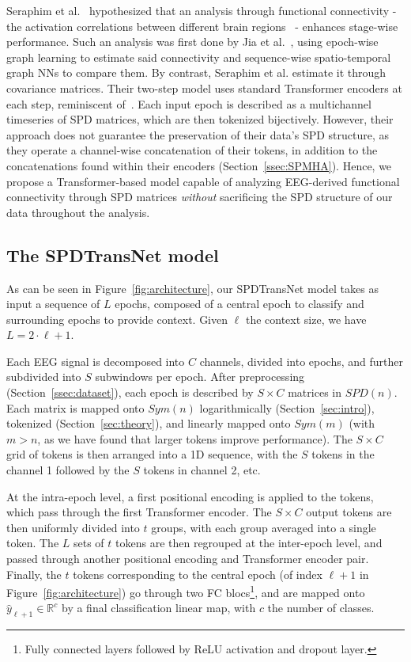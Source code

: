 \documentclass{article}
\begin{document}
Seraphim et al.~\cite{CAIP_article} hypothesized that an analysis through functional connectivity - the activation correlations between different brain regions~\cite{EICKHOFF2015187} - enhances stage-wise performance. Such an analysis was first done by Jia et al.~\cite{jia2020graphsleepnet}, using epoch-wise graph learning to estimate said connectivity and sequence-wise spatio-temporal graph NNs to compare them.
By contrast, Seraphim et al. estimate it through covariance matrices.
Their two-step model uses standard Transformer encoders at each step, reminiscent of~\cite{phan2022sleeptransformer}. Each input epoch is described as a multichannel timeseries of SPD matrices, which are then tokenized bijectively.
However, their approach does not guarantee the preservation of their data's SPD structure, as they operate a channel-wise concatenation of their tokens, in addition to the concatenations found within their encoders (Section~\ref{ssec:SPMHA}).
Hence, we propose a Transformer-based model capable of analyzing EEG-derived functional connectivity through SPD matrices \textit{without} sacrificing the SPD structure of our data throughout the analysis.

\subsection{The SPDTransNet model}
\label{ssec:model}

As can be seen in Figure~\ref{fig:architecture}, our SPDTransNet model takes as input a sequence of $L$ epochs, composed of a central epoch to classify and surrounding epochs to provide context.
Given $\ell$ the context size, we have $L = 2 \cdot \ell + 1$.

Each EEG signal is decomposed into $C$ channels, divided into epochs, and further subdivided into $S$ subwindows per epoch. After preprocessing (Section~\ref{ssec:dataset}), each epoch is described by $S \times C$ matrices in $SPD(n)$.
Each matrix is mapped onto $Sym(n)$ logarithmically (Section~\ref{sec:intro}), tokenized (Section~\ref{sec:theory}), and linearly mapped onto $Sym(m)$ (with $m>n$, as we have found that larger tokens improve performance).
The $S \times C$ grid of tokens is then arranged into a 1D sequence, with the $S$ tokens in the channel 1 followed by the $S$ tokens in channel 2, etc.

At the intra-epoch level, a first positional encoding is applied to the tokens, which pass through the first Transformer encoder. The $S \times C$ output tokens are then uniformly divided into $t$ groups, with each group averaged into a single token.
The $L$ sets of $t$ tokens are then regrouped at the inter-epoch level, and passed through another positional encoding and Transformer encoder pair.
Finally, the $t$ tokens corresponding to the central epoch (of index $\ell + 1$ in Figure~\ref{fig:architecture}) go through two FC blocs\footnote{Fully connected layers followed by ReLU activation and dropout layer.}, and are mapped onto $\hat{y}_{\ell+1} \in \mathbb{R}^c$ by a final classification linear map, with $c$ the number of classes.
\end{document}
